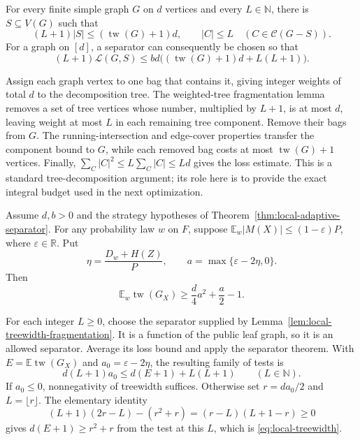 \begin{lemma}\label{lem:local-treewidth-fragmentation}
For every finite simple graph $G$ on $d$ vertices and every $L\in\mathbb N$,
there is $S\subseteq V(G)$ such that
\[
  (L+1)|S|\le (\operatorname{tw}(G)+1)d,
  \qquad |C|\le L\quad(C\in\mathcal C(G-S)).
\]
For a graph on $[d]$, a separator can consequently be chosen so that
\[
  (L+1)\mathcal L(G,S)
       \le bd\bigl((\operatorname{tw}(G)+1)d+L(L+1)\bigr).
\]
\end{lemma}
\begin{proofoutline}
Assign each graph vertex to one bag that contains it, giving integer weights
of total $d$ to the decomposition tree.  The weighted-tree fragmentation
lemma removes a set of tree vertices whose number, multiplied by $L+1$, is
at most $d$, leaving weight at most $L$ in each remaining tree component.
Remove their bags from $G$.  The running-intersection and edge-cover
properties transfer the component bound to $G$, while each removed bag costs
at most $\operatorname{tw}(G)+1$ vertices.  Finally,
$\sum_C|C|^2\le L\sum_C|C|\le Ld$ gives the loss estimate.  This is a
standard tree-decomposition argument; its role here is to provide the exact
integral budget used in the next optimization.
\end{proofoutline}

\begin{corollary}\label{cor:local-treewidth}
Assume $d,b>0$ and the strategy hypotheses of
Theorem~\ref{thm:local-adaptive-separator}.  For any probability law $w$ on
$F$, suppose
$\mathbb E_w|M(X)|\le(1-\varepsilon)P$, where $\varepsilon\in\mathbb R$.
Put
\[
  \eta=\frac{D_w+H(Z)}{P},\qquad
  a=\max\{\varepsilon-2\eta,0\}.
\]
Then
\begin{equation}\label{eq:local-treewidth}
  \mathbb E_w\operatorname{tw}(G_X)
       \ge \frac d4 a^2+\frac a2-1.
\end{equation}
\end{corollary}
\begin{proofoutline}
For each integer $L\ge0$, choose the separator supplied by
Lemma~\ref{lem:local-treewidth-fragmentation}.  It is a function of the public
leaf graph, so it is an allowed separator.  Average its loss bound and apply
the separator theorem.  With $E=\mathbb E\operatorname{tw}(G_X)$ and
$a_0=\varepsilon-2\eta$, the resulting family of tests is
\[
  d(L+1)a_0\le d(E+1)+L(L+1)\qquad(L\in\mathbb N).
\]
If $a_0\le0$, nonnegativity of treewidth suffices.  Otherwise set
$r=da_0/2$ and $L=\lfloor r\rfloor$.  The elementary identity
\[
  (L+1)(2r-L)-(r^2+r)=(r-L)(L+1-r)\ge0
\]
gives $d(E+1)\ge r^2+r$ from the test at this $L$, which is
\eqref{eq:local-treewidth}.
\end{proofoutline}

